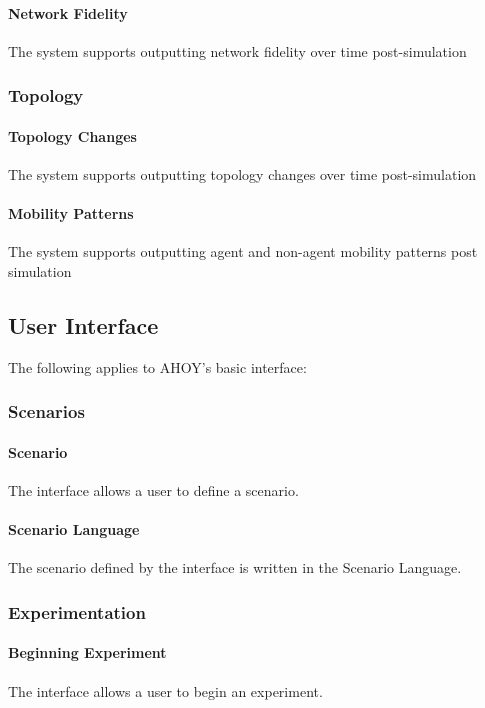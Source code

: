 \documentclass[titlepage]{article}
\begin{document}
    \paragraph{Network Fidelity} The system supports outputting network fidelity over time post-simulation

\subsubsection{Topology}
	\paragraph{Topology Changes} The system supports outputting topology changes over time post-simulation
	\paragraph{Mobility Patterns} The system supports outputting agent and non-agent mobility patterns post simulation


\subsection{User Interface%
  \label{user-interface}%
}

The following applies to AHOY's basic interface:
\subsubsection{Scenarios}
    \paragraph{Scenario} The interface allows a user to define a scenario.
    \paragraph{Scenario Language} The scenario defined by the interface is written in the Scenario Language.
\subsubsection{Experimentation}
    \paragraph{Beginning Experiment} The interface allows a user to begin an experiment.
\end{document}
